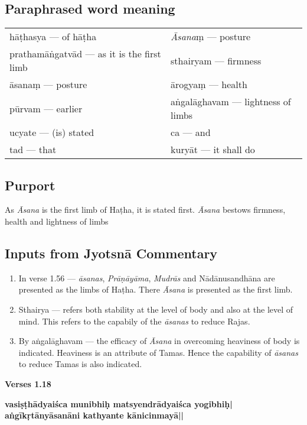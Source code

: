 \subsection*{Paraphrased word meaning}

\begin{longtable}{>{\noindent\raggedright}p{5cm}>{\noindent\raggedright}p{5cm}}
hāṭhasya --- of hāṭha & \textit{Āsana}ṃ --- posture\tabularnewline
prathamāṅgatvād --- as it is the first limb & sthairyam --- firmness\tabularnewline
āsanaṃ --- posture & ārogyaṃ --- health\tabularnewline
pūrvam --- earlier & aṅgalāghavam --- lightness of limbs\tabularnewline
ucyate --- (is) stated & ca --- and\tabularnewline
tad --- that & kuryāt --- it shall do
\end{longtable}


\subsection*{Purport}


As \textit{Āsana} is the first limb of Haṭha, it is stated first. \textit{Āsana} bestows firmness, health and lightness of limbs

\subsection*{Inputs from Jyotsnā Commentary}

\begin{enumerate}
\item In verse 1.56 --- \textit{āsanas}, \textit{Prāṇāyāma}, \textit{Mudrās} and Nādānusandhāna are presented as the limbs of Haṭha. There \textit{Āsana} is presented as the first limb. 
\item Sthairya --- refers both stability at the level of body and also at the level of mind. This refers to the capabily of the \textit{āsanas} to reduce Rajas.
\item By aṅgalāghavam --- the efficacy of \textit{Āsana} in overcoming heaviness of body is indicated. Heaviness is an attribute of Tamas. Hence the capability of \textit{āsanas} to reduce Tamas is also indicated. 
\end{enumerate}

\newpage
\noindent \textbf{Verses 1.18}

\begin{shloka}
\textbf{vasiṣṭhādyaiśca munibhiḥ matsyendrādyaiśca yogibhiḥ|}\\
\textbf{aṅgīkṛtānyāsanāni kathyante kānicinmayā||}
\end{shloka}


